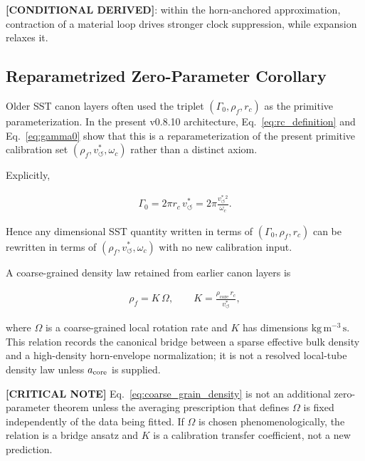 \documentclass[11pt]{article}
\theoremstyle{definition}
\theoremstyle{plain}
\theoremstyle{remark}
\newcommand{\rhoF}{{\rho_{\!f}}}
\newcommand{\rhocore}{\rho_{\mathrm{core}}}
\newcommand{\rc}{{r_c}}
\newcommand{\vchar}{v_{\!\boldsymbol{\circlearrowleft}}^{\ast}}
\begin{document}
        \textbf{[CONDITIONAL DERIVED]}: within the horn-anchored approximation, contraction of a material loop drives stronger clock suppression, while expansion relaxes it.

    \subsection{Reparametrized Zero-Parameter Corollary}
        \label{subsec:zero_parameter_corollary}

        Older SST canon layers often used the triplet $(\Gamma_0,\rhoF,\rc)$ as the primitive parameterization. In the present v0.8.10 architecture, Eq.~\eqref{eq:rc_definition} and Eq.~\eqref{eq:gamma0} show that this is a reparameterization of the present primitive calibration set $(\rhoF,\vchar,\omega_c)$ rather than a distinct axiom.

        Explicitly,

        \begin{align}
            \Gamma_0 = 2\pi \rc \, \vchar
            = 2\pi \frac{\vchar^2}{\omega_c}.
            \label{eq:gamma0_reparam}
        \end{align}

        Hence any dimensional SST quantity written in terms of $(\Gamma_0,\rhoF,\rc)$ can be rewritten in terms of $(\rhoF,\vchar,\omega_c)$ with no new calibration input.

        A coarse-grained density law retained from earlier canon layers is

        \begin{align}
            \rhoF = K\,\Omega,
            \qquad
            K = \frac{\rhocore \, \rc}{\vchar},
            \label{eq:coarse_grain_density}
        \end{align}

        where $\Omega$ is a coarse-grained local rotation rate and $K$ has dimensions $\mathrm{kg\,m^{-3}\,s}$. This relation records the canonical bridge between a sparse effective bulk density and a high-density horn-envelope normalization; it is not a resolved local-tube density law unless $a_{\rm core}$ is supplied.

        \textbf{[CRITICAL NOTE]} Eq.~\eqref{eq:coarse_grain_density} is not an additional zero-parameter theorem unless the averaging prescription that defines $\Omega$ is fixed independently of the data being fitted. If $\Omega$ is chosen phenomenologically, the relation is a bridge ansatz and $K$ is a calibration transfer coefficient, not a new prediction.
\end{document}
